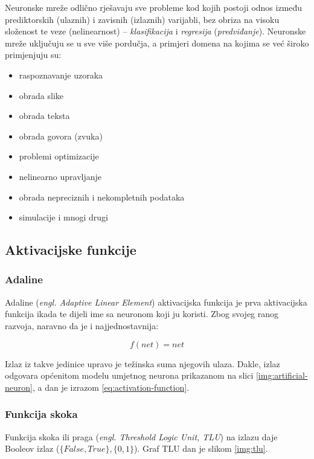 Neuronske mreže odlično rješavaju sve probleme kod kojih postoji odnos između prediktorskih (ulaznih) i zavisnih (izlaznih) varijabli, bez obriza na visoku složenost te veze (nelinearnost) -- \textit{klasifikacija} i \textit{regresija} (\textit{predviđanje}). Neuronske mreže uključuju se u sve više pordučja, a primjeri domena na kojima se već široko primjenjuju su:

\begin{itemize}
\item raspoznavanje uzoraka
\item obrada slike
\item obrada teksta
\item obrada govora (zvuka)
\item problemi optimizacije
\item nelinearno upravljanje
\item obrada nepreciznih i nekompletnih podataka
\item simulacije i mnogi drugi
\end{itemize}


\subsection{Aktivacijske funkcije}

\subsubsection{Adaline}

Adaline (\textit{engl. Adaptive Linear Element}) aktivacijska funkcija je prva aktivacijska funkcija ikada te dijeli ime sa neuronom koji ju koristi. Zbog svojeg ranog razvoja, naravno da je i najjednostavnija:

\begin{equation}
f(net) = net
\label{eq:Adaline aktivacijska funkcija}
\end{equation}

Izlaz iz takve jedinice upravo je težinska suma njegovih ulaza. Dakle, izlaz odgovara općenitom modelu umjetnog neurona prikazanom na slici \ref{img:artificial-neuron}, a dan je izrazom \ref{eq:activation-function}.

\subsubsection{Funkcija skoka}

Funkcija skoka ili praga (\textit{engl. Threshold Logic Unit, TLU}) na izlazu daje Booleov izlaz ($\{False, True\}, \{0, 1\}$). Graf TLU dan je slikom \ref{img:tlu}.

